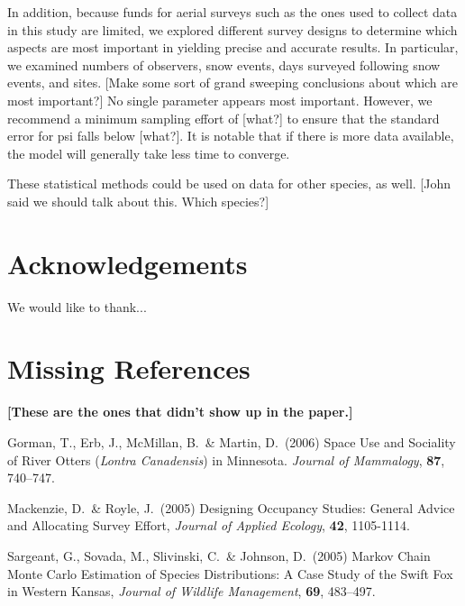 \documentclass[11pt]{article}
\begin{document}
In addition, because funds for aerial surveys such as the ones used to collect
data in this study are limited, we explored different survey designs to
determine which aspects are most important in yielding precise and accurate
results. In particular, we examined numbers of observers, snow events, days
surveyed following snow events, and sites. [Make some sort of grand sweeping
conclusions about which are most important?] No single parameter appears most
important. However, we recommend a minimum sampling effort of [what?] to ensure
that the standard error for psi falls below [what?]. It is notable that if
there is more data available, the model will generally take less time to
converge.

These statistical methods could be used on data for other species, as well.
[John said we should talk about this. Which species?]

\section{Acknowledgements}

We would like to thank...




\section{Missing References}
\noindent

\textbf{[These are the ones that didn't show up in the paper.]}

\leftskip 0.15in

\parindent -0.15in

Gorman, T., Erb, J., McMillan, B.\ \& Martin, D.\ (2006) Space Use and
Sociality of River Otters ({\em Lontra Canadensis}) in Minnesota. {\em Journal
of Mammalogy}, {\bf 87}, 740--747.

\parindent -0.15in
Mackenzie, D.\ \& Royle, J.\ (2005) Designing Occupancy Studies: General Advice
and Allocating Survey Effort, {\em Journal of Applied Ecology}, {\bf 42},
1105-1114.

\parindent -0.15in
Sargeant, G., Sovada, M., Slivinski, C.\ \& Johnson, D.\ (2005) Markov Chain
Monte Carlo Estimation of Species Distributions: A Case Study of the Swift Fox
in Western Kansas, {\em Journal of Wildlife Management}, {\bf 69}, 483--497.
\end{document}

